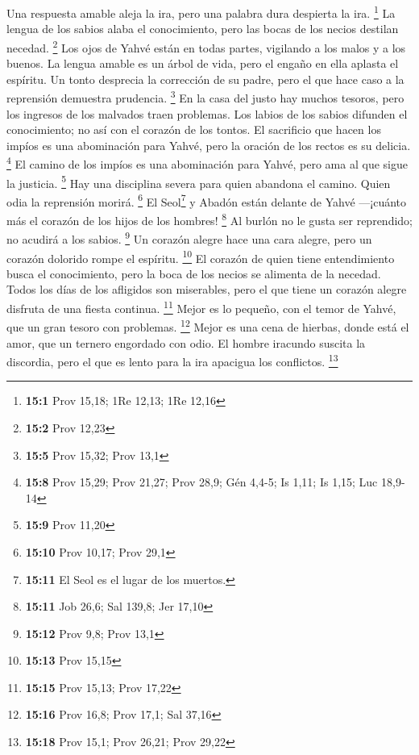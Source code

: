  Una respuesta amable aleja la ira, pero una palabra dura
despierta la ira. \footnote{\textbf{15:1} Prov 15,18; 1Re 12,13; 1Re
  12,16}  La lengua de los sabios alaba el conocimiento,
pero las bocas de los necios destilan necedad. \footnote{\textbf{15:2}
  Prov 12,23}  Los ojos de Yahvé están en todas partes,
vigilando a los malos y a los buenos.  La lengua amable es
un árbol de vida, pero el engaño en ella aplasta el espíritu.
 Un tonto desprecia la corrección de su padre, pero el que
hace caso a la reprensión demuestra prudencia. \footnote{\textbf{15:5}
  Prov 15,32; Prov 13,1}  En la casa del justo hay muchos
tesoros, pero los ingresos de los malvados traen problemas.
 Los labios de los sabios difunden el conocimiento; no así
con el corazón de los tontos.  El sacrificio que hacen los
impíos es una abominación para Yahvé, pero la oración de los rectos es
su delicia. \footnote{\textbf{15:8} Prov 15,29; Prov 21,27; Prov 28,9;
  Gén 4,4-5; Is 1,11; Is 1,15; Luc 18,9-14}  El camino de
los impíos es una abominación para Yahvé, pero ama al que sigue la
justicia. \footnote{\textbf{15:9} Prov 11,20}  Hay una
disciplina severa para quien abandona el camino. Quien odia la
reprensión morirá. \footnote{\textbf{15:10} Prov 10,17; Prov 29,1}
 El Seol\footnote{\textbf{15:11} El Seol es el lugar de
  los muertos.} y Abadón están delante de Yahvé ---¡cuánto más el
corazón de los hijos de los hombres! \footnote{\textbf{15:11} Job 26,6;
  Sal 139,8; Jer 17,10}  Al burlón no le gusta ser
reprendido; no acudirá a los sabios. \footnote{\textbf{15:12} Prov 9,8;
  Prov 13,1}  Un corazón alegre hace una cara alegre,
pero un corazón dolorido rompe el espíritu. \footnote{\textbf{15:13}
  Prov 15,15}  El corazón de quien tiene entendimiento
busca el conocimiento, pero la boca de los necios se alimenta de la
necedad.  Todos los días de los afligidos son miserables,
pero el que tiene un corazón alegre disfruta de una fiesta continua.
\footnote{\textbf{15:15} Prov 15,13; Prov 17,22}  Mejor
es lo pequeño, con el temor de Yahvé, que un gran tesoro con problemas.
\footnote{\textbf{15:16} Prov 16,8; Prov 17,1; Sal 37,16}
 Mejor es una cena de hierbas, donde está el amor, que un
ternero engordado con odio.  El hombre iracundo suscita
la discordia, pero el que es lento para la ira apacigua los conflictos.
\footnote{\textbf{15:18} Prov 15,1; Prov 26,21; Prov 29,22}
